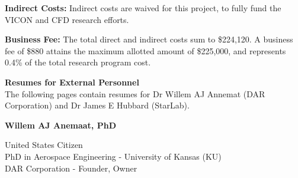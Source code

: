 \documentclass[11pt]{article}
\begin{document}
{\bf Indirect Costs:} Indirect costs are waived for this project, to fully fund the VICON and CFD research efforts.


{\bf Business Fee:} The total direct and indirect costs sum to \$224,120.  A business fee of \$880 attains the maximum allotted amount of \$225,000, and represents 0.4\% of the total research program cost.


{\bf Resumes for External Personnel} \\
The following pages contain resumes for Dr Willem AJ Annemat (DAR Corporation) and Dr James E Hubbard (StarLab).




\newpage
{\bf \Large Willem AJ Anemaat, PhD}

United States Citizen \\
PhD in Aerospace Engineering - University of Kansas (KU) \\
DAR Corporation - Founder, Owner
\end{document}
